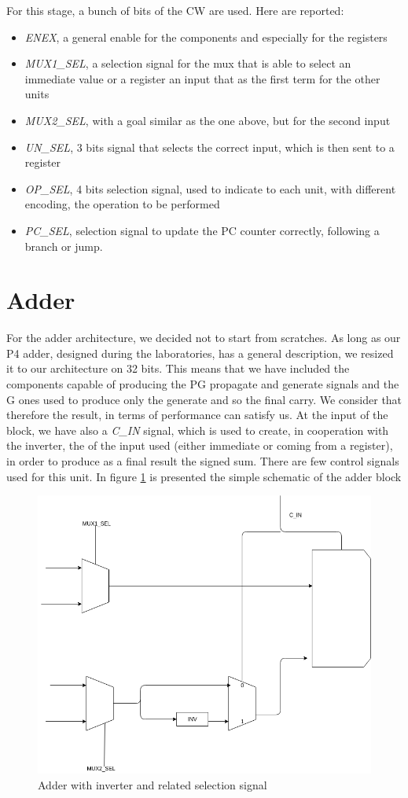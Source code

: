 For this stage, a bunch of bits of the \textsf{CW} are used. Here are reported:
\begin{itemize}
	\item \textit{ENEX}, a general enable for the components and especially for the registers
	\item \textit{MUX1\_SEL}, a selection signal for the mux that is able to select an immediate value or a register an input that as the first term for the other units
	\item \textit{MUX2\_SEL}, with a goal similar as the one above, but for the second input
	\item \textit{UN\_SEL}, 3 bits signal that selects the correct input, which is then sent to a register
	\item \textit{OP\_SEL}, 4 bits selection signal, used to indicate to each unit, with different encoding, the operation to be performed
	\item \textit{PC\_SEL}, selection signal to update the PC counter correctly, following a branch or jump.
\end{itemize}


\section{Adder}

For the adder architecture, we decided not to start from scratches. As long as our P4 adder, designed during the laboratories, has a general description, we resized it to our architecture on 32 bits. This means that we have included the components capable of producing the \textsf{PG} propagate and generate signals and the \textsc{G} ones used to produce only the generate and so the final carry. We consider that therefore the result, in terms of performance can satisfy us. At the input of the block, we have also a \textit{C\_IN} signal, which is used to create, in cooperation with the inverter, the  of the input used (either immediate or coming from a register), in order to produce as a final result the signed sum. There are few control signals used for this unit. In figure \ref{adder_fig} is presented the simple schematic of the adder block

\begin{figure}
	\includegraphics[width=\textwidth]{chapters/figures/adder}
	\caption{Adder with inverter and related selection signal}
	\label{adder_fig}
\end{figure}
